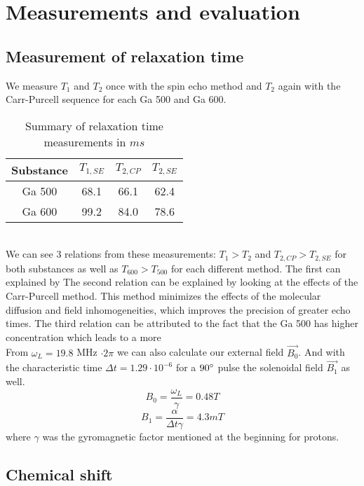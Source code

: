 \section{Measurements and evaluation}\label{measurements-and-evaluation}

\subsection{Measurement of relaxation time}\label{relaxation-time}

We measure $T_1$ and $T_2$ once with the spin echo method and $T_2$ again with the Carr-Purcell sequence for each Ga 500 and Ga 600.
\begin{table}[h!]
\centering
\begin{tabular}{c||c|c|c}
Substance  &  $T_{1,SE}$ & $T_{2,CP}$ & $T_{2,SE}$ \\
\hline
\hline
Ga 500 & 68.1 & 66.1 & 62.4 \\
\hline
Ga 600 & 99.2 & 84.0 & 78.6 \\
\end{tabular}
\caption{Summary of relaxation time measurements in $ms$}
\label{table1}
\end{table}\\
We can see 3 relations from these measurements: $T_{1} > T_{2}$ and $T_{2,CP} > T_{2,SE}$ for both substances as well as $T_{600} > T_{500}$ for each different method. The first can explained by %
The second relation can be explained by looking at the effects of the Carr-Purcell method. This method minimizes the effects of the molecular diffusion and field inhomogeneities, which improves the precision of greater echo times.
The third relation can be attributed to the fact that the Ga 500 has higher concentration which leads to a more %
\vspace{2mm}\\
From $\omega_L = 19.8$ MHz $\cdot 2\pi$ we can also calculate our external field $\vec{B_0}$. And with the characteristic time $\Delta t = 1.29\cdot 10^{-6}$ for a $90\degree$ pulse the solenoidal field $\vec{B_1}$ as well.
\begin{equation}\label{b_0}
	B_0 = \dfrac{\omega_L}{\gamma} = 0.48 T
\end{equation}
\begin{equation}\label{b_1}
	B_1 = \dfrac{\alpha}{\Delta t \gamma} = 4.3 mT
\end{equation}
where $\gamma$ was the gyromagnetic factor mentioned at the beginning for protons.
\subsection{Chemical shift}\label{chemical-shift}

